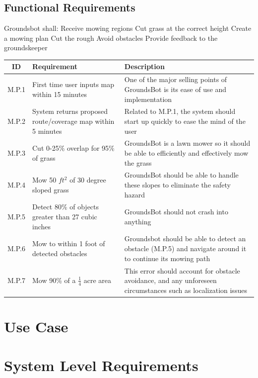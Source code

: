 \documentclass{article}
\begin{document}
\subsection{Functional Requirements}
Groundsbot shall:
  Receive mowing regions
  Cut grass at the correct height
  Create a mowing plan
  Cut the rough 
  Avoid obstacles
  Provide feedback to the groundskeeper
\begin{center}
\begin{tabularx}{\textwidth}{ |c|X|X| }
  \hline
    ID & Requirement & Description \\
  \hline
    M.P.1 &
    First time user inputs map within 15 minutes &
    One of the major selling points of GroundsBot is its ease of use and implementation \\
  \hline
    M.P.2 &
    System returns proposed route/coverage map within 5 minutes &
    Related to M.P.1, the system should start up quickly to ease the mind of the user \\
  \hline
    M.P.3 &
    Cut 0-25\% overlap for 95\% of grass &
    GroundsBot is a lawn mower so it should be able to efficiently and effectively mow the grass \\
  \hline
  	M.P.4 &
  	Mow 50 $ft^2$ of 30 degree sloped grass &
  	GroundsBot should be able to handle these slopes to eliminate the safety hazard \\
  \hline
  	M.P.5 &
  	Detect 80\% of objects greater than 27 cubic inches &
  	GroundsBot should not crash into anything \\
  \hline
  	M.P.6 &
  	Mow to within 1 foot of detected obstacles &
  	Groundsbot should be able to detect an obstacle (M.P.5) and navigate around it to continue its mowing path \\
  \hline
  	M.P.7 &
  	Mow 90\% of a $\frac{1}{4}$ acre area &
  	This error should account for obstacle avoidance, and any unforeseen circumstances such as localization issues \\
  \hline
\end{tabularx}
\end{center}



\section{Use Case}

\section{System Level Requirements}
\end{document}
